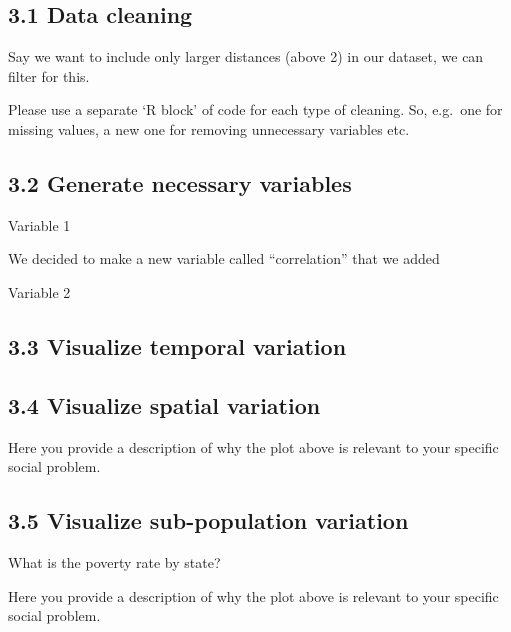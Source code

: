 \documentclass[
]{article}
\newenvironment{Shaded}{\begin{snugshade}}{\end{snugshade}}
\newcommand{\CommentTok}[1]{\textcolor[rgb]{0.56,0.35,0.01}{\textit{#1}}}
\begin{document}
\subsection{3.1 Data cleaning}\label{data-cleaning}

Say we want to include only larger distances (above 2) in our dataset,
we can filter for this.

\begin{Shaded}
\end{Shaded}

Please use a separate `R block' of code for each type of cleaning. So,
e.g.~one for missing values, a new one for removing unnecessary
variables etc.

\subsection{3.2 Generate necessary
variables}\label{generate-necessary-variables}

Variable 1

We decided to make a new variable called ``correlation'' that we added

Variable 2

\subsection{3.3 Visualize temporal
variation}\label{visualize-temporal-variation}

\subsection{3.4 Visualize spatial
variation}\label{visualize-spatial-variation}

Here you provide a description of why the plot above is relevant to your
specific social problem.

\subsection{3.5 Visualize sub-population
variation}\label{visualize-sub-population-variation}

What is the poverty rate by state?

Here you provide a description of why the plot above is relevant to your
specific social problem.
\end{document}
